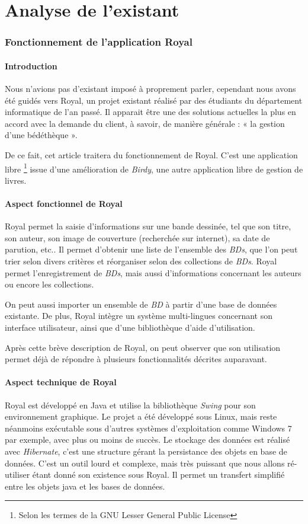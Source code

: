 \part{Analyse de l'existant}


\section{Fonctionnement de l'application Royal}

\subsection{Introduction}
Nous n'avions pas d'existant imposé à proprement parler, cependant nous avons été guidés vers Royal, un projet existant réalisé par des étudiants du département informatique de l'an passé.
Il apparait être une des solutions actuelles la plus en accord avec la demande du client, à savoir, de manière générale : « la gestion d'une bédéthèque ».

De ce fait, cet article traitera du fonctionnement de Royal.
C'est une application 
libre \footnote{Selon les termes de la GNU Lesser General Public License}
issue d'une amélioration de \emph{Birdy}, une autre application libre de gestion de livres.

\subsection{Aspect fonctionnel de Royal}
Royal permet la saisie d'informations sur une bande dessinée, tel que son titre, son auteur, son image de couverture (recherchée sur internet), sa date de parution, etc..
Il permet d'obtenir une liste de l'ensemble des \emph{BDs}, que l'on peut trier selon divers critères et réorganiser selon des collections de \emph{BDs}.
Royal permet l'enregistrement de \emph{BDs}, mais aussi d'informations concernant les auteurs ou encore les collections.

On peut aussi importer un ensemble de \emph{BD} à partir d'une base de données existante.
De plus, Royal intègre un système multi-lingues concernant son interface utilisateur, ainsi que d'une bibliothèque d'aide d'utilisation.

Après cette brève description de Royal, on peut observer que son utilisation permet déjà de répondre à plusieurs fonctionnalités décrites auparavant. 

\subsection{Aspect technique de Royal}
Royal est développé en Java et utilise la bibliothèque \emph{Swing} pour son environnement graphique. 
Le projet a été développé sous Linux, mais reste néanmoins exécutable sous d'autres systèmes d'exploitation comme Windows 7 par exemple, avec plus ou moins de succès. 
Le stockage des données est réalisé avec \emph{Hibernate}, c'est une structure gérant la persistance des objets en base de données. 
C'est un outil lourd et complexe, mais très puissant que nous allons ré-utiliser étant donné son existence sous Royal. 
Il permet un transfert simplifié entre les objets java et les bases de données.


